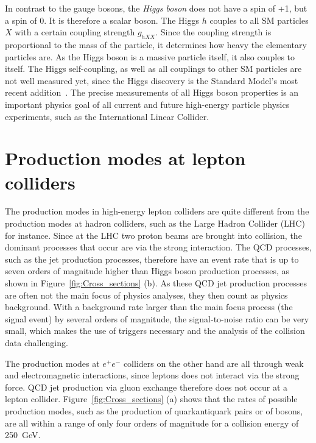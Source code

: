 In contrast to the gauge bosons, the \textit{Higgs boson} does not have a spin of +1, but a spin of 0.
It is therefore a scalar boson.
The Higgs $h$ couples to all SM particles $X$ with a certain coupling strength $g_{hXX}$.
Since the coupling strength is proportional to the mass of the particle, it determines how heavy the elementary particles are.
As the Higgs boson is a massive particle itself, it also couples to itself.
The Higgs self-coupling, as well as all couplings to other SM particles are not well measured yet, since the Higgs discovery is the Standard Model's most recent addition~\cite{Higgs,Higgs2}.
The precise measurements of all Higgs boson properties is an important physics goal of all current and future high-energy particle physics experiments, such as the International Linear Collider. 

\section{Production modes at lepton colliders}
\label{Production_modes}
The production modes in high-energy lepton colliders are quite different from the production modes at hadron colliders, such as the Large Hadron Collider (LHC) for instance.
Since at the LHC two proton beams are brought into collision, the dominant processes that occur are via the strong interaction.
The QCD processes, such as the jet production processes, therefore have an event rate that is up to seven orders of magnitude higher than Higgs boson production processes, as shown in Figure~\ref{fig:Cross_sections} (b).
As these QCD jet production processes are often not the main focus of physics analyses, they then count as physics background.
With a background rate larger than the main focus process (the signal event) by several orders of magnitude, the signal-to-noise ratio can be very small, which makes the use of triggers necessary and the analysis of the collision data challenging.

The production modes at $e^+e^-$ colliders on the other hand are all through weak and electromagnetic interactions, since leptons does not interact via the strong force.
QCD jet production via gluon exchange therefore does not occur at a lepton collider.
Figure~\ref{fig:Cross_sections} (a) shows that the rates of possible production modes, such as the production of quark\textendash antiquark pairs or of bosons, are all within a range of only four orders of magnitude for a collision energy of \SI{250}{\GeV}.


